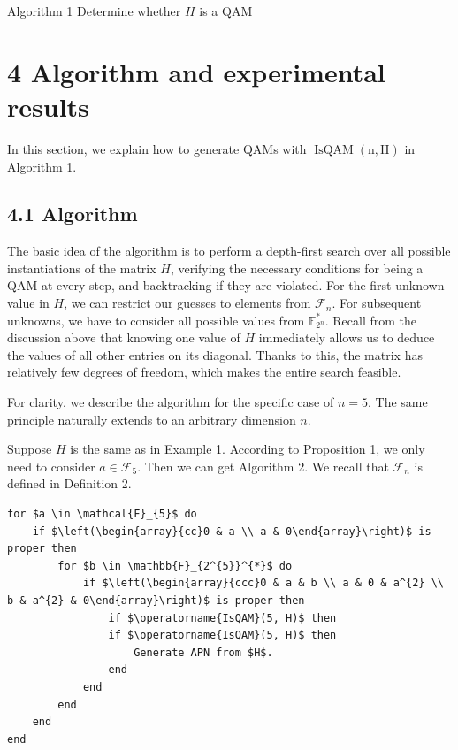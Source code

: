 \documentclass[10pt]{article}
\begin{document}
Algorithm 1 Determine whether $H$ is a QAM

\section*{4 Algorithm and experimental results}
In this section, we explain how to generate QAMs with $\operatorname{IsQAM}(\mathrm{n}, \mathrm{H})$ in Algorithm 1.

\subsection*{4.1 Algorithm}
The basic idea of the algorithm is to perform a depth-first search over all possible instantiations of the matrix $H$, verifying the necessary conditions for being a QAM at every step, and backtracking if they are violated. For the first unknown value in $H$, we can restrict our guesses to elements from $\mathcal{F}_{n}$. For subsequent unknowns, we have to consider all possible values from $\mathbb{F}_{2^{n}}^{*}$. Recall from the discussion above that knowing one value of $H$ immediately allows us to deduce the values of all other entries on its diagonal. Thanks to this, the matrix has relatively few degrees of freedom, which makes the entire search feasible.

For clarity, we describe the algorithm for the specific case of $n=5$. The same principle naturally extends to an arbitrary dimension $n$.

Suppose $H$ is the same as in Example 1. According to Proposition 1, we only need to consider $a \in \mathcal{F}_{5}$. Then we can get Algorithm 2. We recall that $\mathcal{F}_{n}$ is defined in Definition 2.

\begin{verbatim}
for $a \in \mathcal{F}_{5}$ do
    if $\left(\begin{array}{cc}0 & a \\ a & 0\end{array}\right)$ is proper then
        for $b \in \mathbb{F}_{2^{5}}^{*}$ do
            if $\left(\begin{array}{ccc}0 & a & b \\ a & 0 & a^{2} \\ b & a^{2} & 0\end{array}\right)$ is proper then
                if $\operatorname{IsQAM}(5, H)$ then
                if $\operatorname{IsQAM}(5, H)$ then
                    Generate APN from $H$.
                end
            end
        end
    end
end
\end{verbatim}
\end{document}
